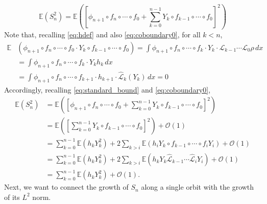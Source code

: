 \documentclass{amsart}
\numberwithin{equation}{section}
\newcommand\cL{{\mathcal L}}
\newcommand\cO{{\mathcal O}}
\newcommand\bE{{\mathbb E}}
\newcommand{\wcL}{\widehat \cL}
\begin{document}
\[
\bE(S_n^2)=\bE\left(\left[\phi_{n+1}\circ  f_{n}\circ \cdots\circ f_0+\sum_{k=0}^{n-1}Y_k\circ f_{k-1}\circ \cdots\circ f_0\right]^2\right)
\]
Note that, recalling \eqref{eq:hdef} and also \eqref{eq:coboundary0}, for all $k<n$,
\[
\begin{split}
\bE&  \left( \phi_{n+1} \circ f_n \circ \cdots \circ f_0 \cdot Y_k \circ f_{k-1} \circ \cdots \circ f_0 \right)
 = \int \phi_{n+1} \circ f_n \circ \cdots \circ f_k \cdot Y_k  \cdot \cL_{k-1} \cdots \cL_0 \rho \, dx \\
& = \int \phi_{n+1} \circ f_n \circ \cdots \circ f_k \cdot Y_k h_k \, dx \\
& = \int \phi_{n+1} \circ f_n \circ \cdots \circ f_{k+1} \cdot h_{k+1} \cdot \wcL_k (Y_k) \, dx = 0
\end{split}
\]
Accordingly, recalling \eqref{eq:standard_bound} and \eqref{eq:coboundary0},
\begin{equation}\label{eq:martingale}
\begin{split}
\bE(S_n^2)&=\bE\left(\left[\phi_{n+1}\circ  f_{n}\circ \cdots\circ f_0+\sum_{k=0}^{n-1}Y_k\circ f_{k-1}\circ \cdots\circ f_0\right]^2\right)\\
&=\bE\left(\left[\sum_{k=0}^{n-1}Y_k\circ f_{k-1}\circ \cdots\circ f_0\right]^2\right)+\cO(1)\\
&=\sum_{k=0}^{n-1}\bE\left(h_{k}Y_k^2\right)+2 \sum_{k>i}\bE\left(h_i Y_k\circ f_{k-1}\circ \cdots\circ f_{i} Y_i\right)+\cO(1)\\
&=\sum_{k=0}^{n-1}\bE\left(h_{k}Y_k^2\right)+2 \sum_{k>i}\bE\left(h_{k} Y_k\wcL_{k-1}\cdots\wcL_i Y_i\right)+\cO(1)\\
&=\sum_{k=0}^{n-1}\bE\left(h_{k}Y_k^2\right)+\cO(1).
\end{split}
\end{equation}
Next, we want to connect the growth of $S_n$ along a single orbit with the growth of its $L^2$ norm.
\end{document}

